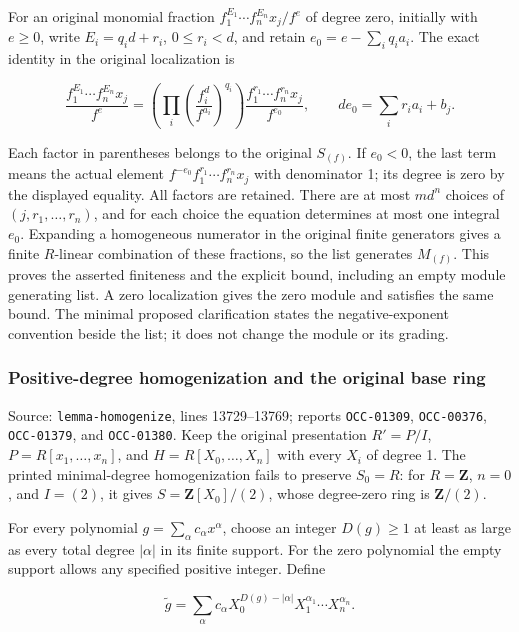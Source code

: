 For an original monomial fraction \(f_1^{E_1}\cdots f_n^{E_n}x_j/f^e\) of degree zero, initially with \(e\geq0\), write \(E_i=q_i d+r_i\), \(0\leq r_i<d\), and retain \(e_0=e-\sum_i q_i a_i\). The exact identity in the original localization is

\[
\frac{f_1^{E_1}\cdots f_n^{E_n}x_j}{f^e}
=\left(\prod_i\left(\frac{f_i^d}{f^{a_i}}\right)^{q_i}\right)
\frac{f_1^{r_1}\cdots f_n^{r_n}x_j}{f^{e_0}},
\qquad de_0=\sum_i r_i a_i+b_j.
\]

Each factor in parentheses belongs to the original \(S_{(f)}\). If \(e_0<0\), the last term means the actual element \(f^{-e_0}f_1^{r_1}\cdots f_n^{r_n}x_j\) with denominator 1; its degree is zero by the displayed equality. All factors are retained. There are at most \(m d^n\) choices of \((j,r_1,\ldots,r_n)\), and for each choice the equation determines at most one integral \(e_0\). Expanding a homogeneous numerator in the original finite generators gives a finite \(R\)-linear combination of these fractions, so the list generates \(M_{(f)}\). This proves the asserted finiteness and the explicit bound, including an empty module generating list. A zero localization gives the zero module and satisfies the same bound. The minimal proposed clarification states the negative-exponent convention beside the list; it does not change the module or its grading.

\subsubsection{Positive-degree homogenization and the original base ring}\label{positive-degree-homogenization-and-the-original-base-ring}

Source: \texttt{lemma-homogenize}, lines 13729--13769; reports \texttt{OCC-01309}, \texttt{OCC-00376}, \texttt{OCC-01379}, and \texttt{OCC-01380}. Keep the original presentation \(R'=P/I\), \(P=R[x_1,\ldots,x_n]\), and \(H=R[X_0,\ldots,X_n]\) with every \(X_i\) of degree 1. The printed minimal-degree homogenization fails to preserve \(S_0=R\): for \(R=\mathbf Z\), \(n=0\), and \(I=(2)\), it gives \(S=\mathbf Z[X_0]/(2)\), whose degree-zero ring is \(\mathbf Z/(2)\).

For every polynomial \(g=\sum_\alpha c_\alpha x^\alpha\), choose an integer \(D(g)\geq1\) at least as large as every total degree \(|\alpha|\) in its finite support. For the zero polynomial the empty support allows any specified positive integer. Define

\[
\widetilde g=\sum_\alpha c_\alpha
 X_0^{D(g)-|\alpha|}X_1^{\alpha_1}\cdots X_n^{\alpha_n}.
\]


